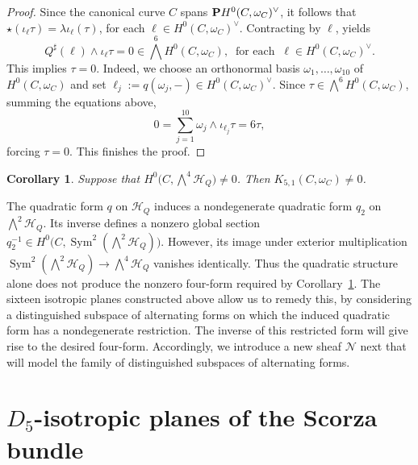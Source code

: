 \documentclass[11pt]{amsart}
\newtheorem{corollary}[theorem]{Corollary}
\theoremstyle{definition}
\def\PP{{\textbf P}}
\def\cH{\mathcal{H}}
\begin{document}
\begin{proof}
Since the canonical curve $C$ spans $\PP H^0(C,\omega_C)^\vee$, it follows that $\star(\iota_{\ell}\tau)=\lambda \iota_{\ell}(\tau)$, for each   $\ell\in H^0(C,\omega_C)^\vee$.  Contracting by $\ell$, yields
\[
 Q^\sharp(\ell)\wedge\iota_{\ell}\tau=0\in \bigwedge^6 H^0(C,\omega_C), \ \mbox{ for each  } \ \ell\in H^0(C,\omega_C)^\vee.
\]
This implies $\tau=0$. Indeed, we choose an orthonormal basis $\omega_1,\ldots,\omega_{10}$ of $H^0(C, \omega_C)$ and set $\ell_j:=q(\omega_j,-)\in H^0(C,\omega_C)^{\vee}$.  Since $\tau\in \bigwedge^6 H^0(C,\omega_C)$, summing the equations above,
\[
 0=\sum_{j=1}^{10}\omega_j\wedge\iota_{\ell_j}\tau=6\tau,
\]
forcing $\tau=0$. This finishes the proof. 
\end{proof}




\begin{corollary}\label{cor:neq 0}
    Suppose that $H^0\bigl(C,\bigwedge^4\cH_Q\bigr)\ne 0$. Then $K_{5,1}(C,\omega_C)\ne 0$.
\end{corollary}



The quadratic form $q$ on $\mathcal H_Q$ induces
a nondegenerate quadratic form $q_2$ on
$\bigwedge^2\mathcal H_Q$. Its inverse defines
a nonzero global section
$
q_2^{-1}\in H^0\bigl(C,
\operatorname{Sym}^2(\bigwedge^2\mathcal H_Q)\bigr).
$
However, its image under exterior multiplication
$
\operatorname{Sym}^2(\bigwedge^2\mathcal H_Q)
\longrightarrow \bigwedge^4\mathcal H_Q
$
vanishes identically. Thus the quadratic structure alone does not produce the nonzero four-form required by
Corollary~\ref{cor:neq 0}. The sixteen isotropic planes
constructed above allow us to remedy this, by considering a distinguished subspace of alternating forms on which the induced quadratic
form has a nondegenerate restriction. The inverse of this restricted form will give rise to the desired four-form. Accordingly, we introduce a new sheaf $\mathcal N$ next that will model the family of distinguished subspaces of
alternating forms.









\section{$D_5$-isotropic planes of the Scorza bundle}
\end{document}
